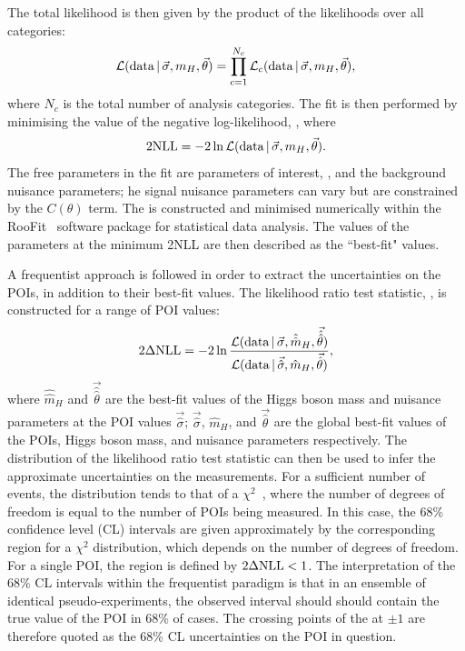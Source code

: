 \newpage %
The total likelihood \Like is then given by the product of the likelihoods over all categories:
\begin{equation}
\mathcal{L}(\textrm{data}\,|\,\vec{\sigma},m_{H},\vec{\theta}) = \prod^{N_c}_{c=1} \mathcal{L}_c(\textrm{data}\,|\,\vec{\sigma},m_{H},\vec{\theta}),
\end{equation}
where $N_c$ is the total number of analysis categories.
The fit is then performed by minimising the value of the negative log-likelihood, \NLL, where
\begin{equation}
2\textrm{NLL} = -2\ln\mathcal{L}(\textrm{data}\,|\,\vec{\sigma},m_{H},\vec{\theta}).
\end{equation}
The free parameters in the fit are parameters of interest, \mH, and the background nuisance parameters;
he signal nuisance parameters can vary but are constrained by the $C(\theta)$ term.
The \NLL is constructed and minimised numerically within the RooFit~\cite{RooFit} 
software package for statistical data analysis.
The values of the parameters at the minimum 2NLL are then described as the ``best-fit" values.

A frequentist approach is followed in order to extract the uncertainties on the POIs, 
in addition to their best-fit values.
The likelihood ratio test statistic, \dNLL, is constructed for a range of POI values:
\begin{equation}
2\Delta\textrm{NLL} = -2\ln\frac{ \mathcal{L}(\textrm{data}\,|\,\vec{\sigma},\hat{\hat{m}}_H,\vec{\hat{\hat{\theta}}}) }
                  { \mathcal{L}(\textrm{data}\,|\,\vec{\hat{\sigma}},\hat{m}_H,\vec{\hat{\theta}}) },
\end{equation}
where $\hat{\hat{m}}_H$ and $\vec{\hat{\hat{\theta}}}$ are the best-fit values 
of the Higgs boson mass and nuisance parameters at the POI values $\vec{\hat{\sigma}}$;
$\vec{\hat{\sigma}}$, $\hat{m}_H$, and $\vec{\hat{\theta}}$ are the global best-fit values 
of the POIs, Higgs boson mass, and nuisance parameters respectively.
The distribution of the likelihood ratio test statistic 
can then be used to infer the approximate uncertainties on the measurements.
For a sufficient number of events, %
the distribution tends to that of a $\chi^2$~\cite{Asymptotic}, 
where the number of degrees of freedom is equal to the number of POIs being measured.
In this case, the 68\% confidence level (CL) intervals 
are given approximately by the corresponding region for a $\chi^2$ distribution, 
which depends on the number of degrees of freedom.
For a single POI, the region is defined by $2\Delta\textrm{NLL} < 1$.
The interpretation of the 68\% CL intervals within the frequentist paradigm 
is that in an ensemble of identical pseudo-experiments, 
the observed interval should should contain the true value of the POI in 68\% of cases.
The crossing points of the \dNLL at $\pm 1$ are therefore quoted
as the 68\% CL uncertainties on the POI in question.

